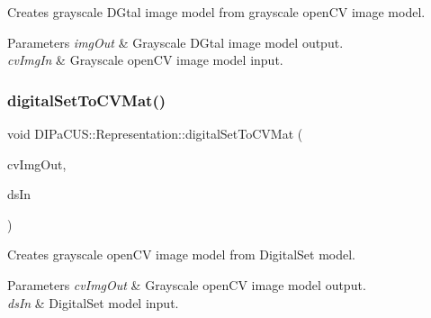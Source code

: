 Creates grayscale D\+Gtal image model from grayscale open\+CV image model. 


\begin{DoxyParams}{Parameters}
{\em img\+Out} & Grayscale D\+Gtal image model output. \\
\hline
{\em cv\+Img\+In} & Grayscale open\+CV image model input. \\
\hline
\end{DoxyParams}
\mbox{\label{namespaceDIPaCUS_1_1Representation_ad8ad6c44d5f4a4f7033fac84899bb3fa}} 
\subsubsection{\texorpdfstring{digital\+Set\+To\+C\+V\+Mat()}{digitalSetToCVMat()}}
{\footnotesize\ttfamily void D\+I\+Pa\+C\+U\+S\+::\+Representation\+::digital\+Set\+To\+C\+V\+Mat (\begin{DoxyParamCaption}\item[{cv\+::\+Mat \&}]{cv\+Img\+Out,  }\item[{const \hyperlink{namespaceDIPaCUS_1_1Representation_a6eca0b4fa262f2d600f11d82ee10b5a6}{Digital\+Set} \&}]{ds\+In }\end{DoxyParamCaption})}



Creates grayscale open\+CV image model from Digital\+Set model. 


\begin{DoxyParams}{Parameters}
{\em cv\+Img\+Out} & Grayscale open\+CV image model output. \\
\hline
{\em ds\+In} & Digital\+Set model input. \\
\hline
\end{DoxyParams}
\mbox{\label{namespaceDIPaCUS_1_1Representation_a41889947a0233ac7c4433140f2d8886a}} 
